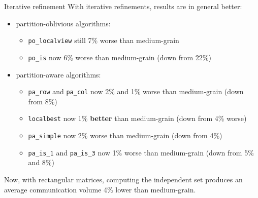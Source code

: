 \begin{frame}{Iterative refinement}
	With iterative refinements, results are in general better:

	\begin{itemize}
		\item partition-oblivious algorithms:
			\begin{itemize}
				\item \texttt{po\_localview} still 7\% worse than medium-grain
				\item \texttt{po\_is} now 6\% worse than medium-grain (down from 22\%)
			\end{itemize}
		\item partition-aware algorithms:
			\begin{itemize}
				\item \texttt{pa\_row} and \texttt{pa\_col} now 2\% and 1\% worse than medium-grain (down from 8\%)
				\item \texttt{localbest} now 1\% \textbf{better} than medium-grain (down from 4\% worse)
				\item \texttt{pa\_simple} now 2\% worse than medium-grain (down from 4\%)
				\item \texttt{pa\_is\_1} and \texttt{pa\_is\_3} now 1\% worse than medium-grain (down from 5\% and 8\%)
			\end{itemize}
	\end{itemize}

	Now, with rectangular matrices, computing the independent set produces an average communication volume 4\% lower than medium-grain.

\end{frame}
